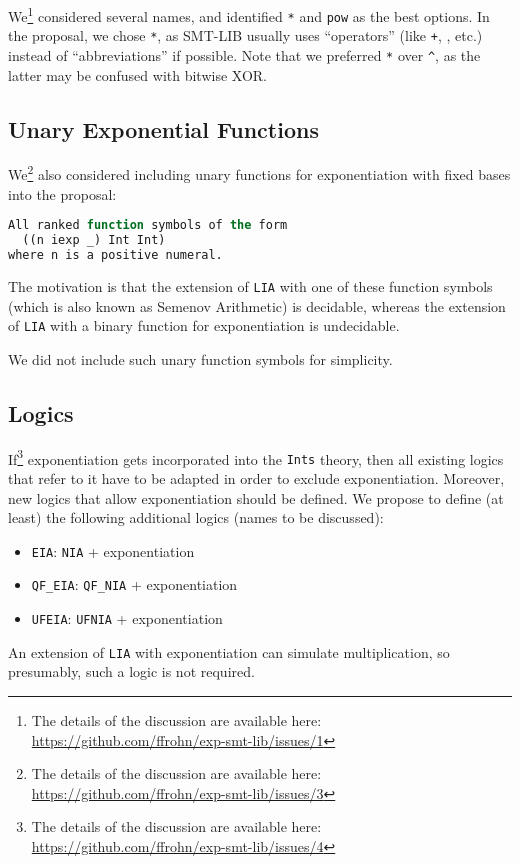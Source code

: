 \documentclass{article}
\begin{document}
We\footnote{The details of the discussion are available here: \url{https://github.com/ffrohn/exp-smt-lib/issues/1}} considered several names, and identified {\tt **} and {\tt pow} as the best options.
%
In the proposal, we chose {\tt **}, as SMT-LIB usually uses ``operators'' (like {\tt +}, {\tt *}, etc.) instead of ``abbreviations'' if possible.
%
Note that we preferred {\tt **} over {\tt \^{}}, as the latter may be confused with bitwise XOR.

\subsection{Unary Exponential Functions}

We\footnote{The details of the discussion are available here: \url{https://github.com/ffrohn/exp-smt-lib/issues/3}} also considered including unary functions for exponentiation with fixed bases into the proposal:
%
\begin{lstlisting}[language=Lisp]
All ranked function symbols of the form
  ((n iexp _) Int Int)
where n is a positive numeral.
\end{lstlisting}
%
The motivation is that the extension of {\tt LIA} with one of these function symbols (which is also known as Semenov Arithmetic) is decidable, whereas the extension of {\tt LIA} with a binary function for exponentiation is undecidable.

We did not include such unary function symbols for simplicity.

\subsection{Logics}

If\footnote{The details of the discussion are available here: \url{https://github.com/ffrohn/exp-smt-lib/issues/4}} exponentiation gets incorporated into the {\tt Ints} theory, then all existing logics that refer to it have to be adapted in order to exclude exponentiation.
%
Moreover, new logics that allow exponentiation should be defined.
%
We propose to define (at least) the following additional logics (names to be discussed):
%
\begin{itemize}
\item {\tt EIA}: {\tt NIA} + exponentiation
\item {\tt QF\_EIA}: {\tt QF\_NIA} + exponentiation
\item {\tt UFEIA}: {\tt UFNIA} + exponentiation
\end{itemize}
%
An extension of {\tt LIA} with exponentiation can simulate multiplication, so presumably, such a logic is not required.


\end{document}
